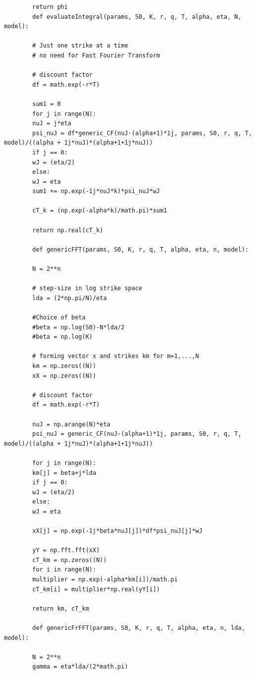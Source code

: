 \documentclass[margin=1in]{article}
\begin{document}
\begin{lstlisting}
       	return phi
       	def evaluateIntegral(params, S0, K, r, q, T, alpha, eta, N, model):
       	
       	# Just one strike at a time
       	# no need for Fast Fourier Transform
       	
       	# discount factor
       	df = math.exp(-r*T)
       	
       	sum1 = 0
       	for j in range(N):
       	nuJ = j*eta
       	psi_nuJ = df*generic_CF(nuJ-(alpha+1)*1j, params, S0, r, q, T, model)/((alpha + 1j*nuJ)*(alpha+1+1j*nuJ))
       	if j == 0:
       	wJ = (eta/2)
       	else:
       	wJ = eta
       	sum1 += np.exp(-1j*nuJ*k)*psi_nuJ*wJ
       	
       	cT_k = (np.exp(-alpha*k)/math.pi)*sum1
       	
       	return np.real(cT_k) 
       	
       	def genericFFT(params, S0, K, r, q, T, alpha, eta, n, model):
       	
       	N = 2**n
       	
       	# step-size in log strike space
       	lda = (2*np.pi/N)/eta
       	
       	#Choice of beta
       	#beta = np.log(S0)-N*lda/2
       	#beta = np.log(K)
       	
       	# forming vector x and strikes km for m=1,...,N
       	km = np.zeros((N))
       	xX = np.zeros((N))
       	
       	# discount factor
       	df = math.exp(-r*T)
       	
       	nuJ = np.arange(N)*eta
       	psi_nuJ = generic_CF(nuJ-(alpha+1)*1j, params, S0, r, q, T, model)/((alpha + 1j*nuJ)*(alpha+1+1j*nuJ))
       	
       	for j in range(N):  
       	km[j] = beta+j*lda
       	if j == 0:
       	wJ = (eta/2)
       	else:
       	wJ = eta
       	
       	xX[j] = np.exp(-1j*beta*nuJ[j])*df*psi_nuJ[j]*wJ
       	
       	yY = np.fft.fft(xX)
       	cT_km = np.zeros((N))  
       	for i in range(N):
       	multiplier = np.exp(-alpha*km[i])/math.pi
       	cT_km[i] = multiplier*np.real(yY[i])
       	
       	return km, cT_km
       	
       	def genericFrFFT(params, S0, K, r, q, T, alpha, eta, n, lda, model):
       	
       	N = 2**n
       	gamma = eta*lda/(2*math.pi)
       	

\end{lstlisting}
\end{document}
